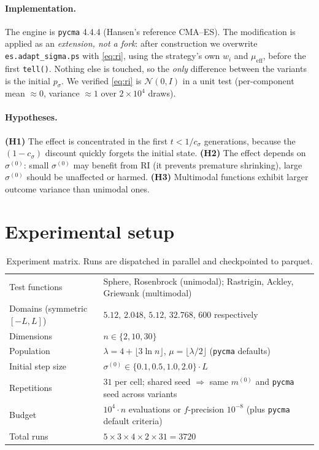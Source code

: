 \documentclass[11pt]{article}
\begin{document}
\paragraph{Implementation.} The engine is \texttt{pycma} 4.4.4 (Hansen's reference CMA--ES).
The modification is applied as an \emph{extension, not a fork}: after construction we
overwrite \texttt{es.adapt\_sigma.ps} with \eqref{eq:ri}, using the strategy's own
$w_i$ and $\mu_{\text{eff}}$, before the first \texttt{tell()}. Nothing else is touched, so
the \emph{only} difference between the variants is the initial $p_\sigma$. We verified
\eqref{eq:ri} is $\mathcal N(0,I)$ in a unit test (per-component mean $\approx 0$, variance
$\approx 1$ over $2\times10^4$ draws).

\paragraph{Hypotheses.}
\textbf{(H1)} The effect is concentrated in the first $t<1/c_\sigma$ generations, because the
$(1-c_\sigma)$ discount quickly forgets the initial state.
\textbf{(H2)} The effect depends on $\sigma^{(0)}$: small $\sigma^{(0)}$ may benefit from RI
(it prevents premature shrinking), large $\sigma^{(0)}$ should be unaffected or harmed.
\textbf{(H3)} Multimodal functions exhibit larger outcome variance than unimodal ones.

\section{Experimental setup}

\begin{table}[H]
\centering
\small
\begin{tabular}{ll}
\toprule
Test functions & Sphere, Rosenbrock (unimodal); Rastrigin, Ackley, Griewank (multimodal) \\
Domains (symmetric $[-L,L]$) & $5.12,\,2.048,\,5.12,\,32.768,\,600$ respectively \\
Dimensions & $n\in\{2,10,30\}$ \\
Population & $\lambda=4+\lfloor 3\ln n\rfloor$, $\mu=\lfloor\lambda/2\rfloor$ (\texttt{pycma} defaults) \\
Initial step size & $\sigma^{(0)}\in\{0.1,0.5,1.0,2.0\}\cdot L$ \\
Repetitions & $31$ per cell; shared seed $\Rightarrow$ same $m^{(0)}$ and \texttt{pycma} seed across variants \\
Budget & $10^4\!\cdot n$ evaluations or $f$-precision $10^{-8}$ (plus \texttt{pycma} default criteria) \\
Total runs & $5\times 3\times 4\times 2\times 31 = 3720$ \\
\bottomrule
\end{tabular}
\caption{Experiment matrix. Runs are dispatched in parallel and checkpointed to parquet.}
\end{table}
\end{document}
